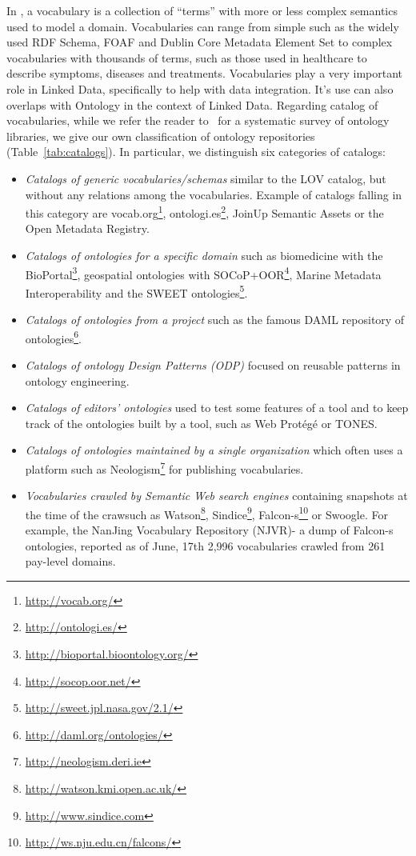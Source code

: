 In \cite{glossairegld}, a vocabulary is a collection of ``terms'' with more or less complex semantics used to model a domain. Vocabularies can range from simple such as the widely used RDF Schema, FOAF and Dublin Core Metadata Element Set to complex vocabularies with thousands of terms, such as those used in healthcare to describe symptoms, diseases and treatments. Vocabularies play a very important role in Linked Data, specifically to help with data integration. It's use can also overlaps with Ontology in the context of Linked Data. Regarding catalog of vocabularies, while we refer the reader to~\cite{AquinJoWS12} for a systematic survey of ontology libraries, we give our own classification of ontology repositories (Table~\ref{tab:catalogs}). 
In particular, we distinguish six categories of catalogs:
\begin{itemize}
 \item \textit{Catalogs of generic vocabularies/schemas} similar to the LOV catalog, but without any relations among the vocabularies. Example of catalogs falling in this category are vocab.org\footnote{\url{http://vocab.org/}}, ontologi.es\footnote{\url{http://ontologi.es/}}, JoinUp Semantic Assets or the Open Metadata Registry.
 \item \textit{Catalogs of ontologies for a specific domain} such as biomedicine with the BioPortal\footnote{\url{http://bioportal.bioontology.org/}}, geospatial ontologies with SOCoP+OOR\footnote{\url{http://socop.oor.net/}}, Marine Metadata Interoperability and the SWEET ontologies\footnote{\url{http://sweet.jpl.nasa.gov/2.1/}}.
 \item \textit{Catalogs of ontologies from a project} such as the famous DAML repository of ontologies\footnote{\url{http://daml.org/ontologies/}}.
 \item \textit{Catalogs of ontology Design Patterns (ODP)} focused on reusable patterns in ontology engineering.
 \item \textit{Catalogs of editors' ontologies} used to test some features of a tool and to keep track of the ontologies built by a tool, such as Web Prot\'{e}g\'{e} or TONES.
 \item \textit{Catalogs of ontologies maintained by a single organization} which often uses a platform such as Neologism\footnote{\url{http://neologism.deri.ie}} for publishing vocabularies.
 \item \textit{Vocabularies crawled by Semantic Web search engines} containing snapshots at the time of the crawsuch as Watson\footnote{\url{http://watson.kmi.open.ac.uk/}}, Sindice\footnote{\url{http://www.sindice.com}}, Falcon-s\footnote{\url{http://ws.nju.edu.cn/falcons/}} or Swoogle. For example, the NanJing Vocabulary Repository (NJVR)- a dump of Falcon-s ontologies, reported as of June, 17th 2,996 vocabularies crawled from 261 pay-level domains.
\end{itemize}

